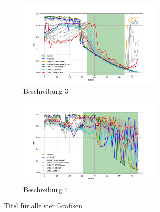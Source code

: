 \begin{figure}[H]
    \begin{subfigure}[b]{1\textwidth}
        \centering
        \includegraphics[width=0.8\textwidth]{PICs/experiments/temporalModels/plot_ious_sequence_1.pdf}
        \caption{Beschreibung 3}
        \label{fig:grafik3}
    \end{subfigure}
    \begin{subfigure}[b]{1\textwidth}
        \centering
        \includegraphics[width=0.8\textwidth]{PICs/experiments/temporalModels/plot_ious_sequence_3.pdf}
        \caption{Beschreibung 4}
        \label{fig:grafik4}
    \end{subfigure}

    \caption{Titel für alle vier Grafiken}
    \label{fig:4grafiken}
\end{figure}